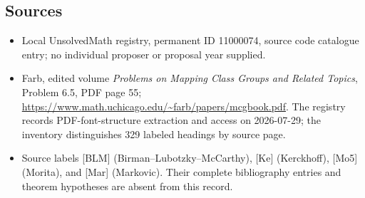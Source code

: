 \documentclass[11pt]{article}
\begin{document}
\subsection{Sources}
\begin{itemize}
\item Local UnsolvedMath registry, permanent ID 11000074, source code catalogue entry; no individual proposer or proposal year supplied.
\item Farb, edited volume \emph{Problems on Mapping Class Groups and Related Topics}, Problem 6.5, PDF page 55; \url{https://www.math.uchicago.edu/~farb/papers/mcgbook.pdf}. The registry records PDF-font-structure extraction and access on 2026-07-29; the inventory distinguishes 329 labeled headings by source page.
\item Source labels [BLM] (Birman--Lubotzky--McCarthy), [Ke] (Kerckhoff), [Mo5] (Morita), and [Mar] (Markovic). Their complete bibliography entries and theorem hypotheses are absent from this record.
\end{itemize}
\end{document}
